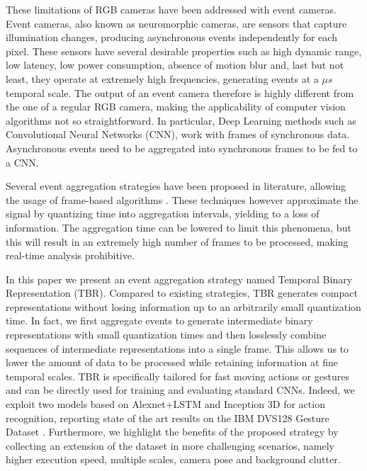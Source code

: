 \documentclass[a4paper,conference]{IEEEtran}
\begin{document}
These limitations of RGB cameras have been addressed with event cameras. Event cameras, also known as neuromorphic cameras, are sensors that capture illumination changes, producing asynchronous events independently for each pixel. These sensors have several desirable properties such as high dynamic range, low latency, low power consumption, absence of motion blur and, last but not least, they operate at extremely high frequencies, generating events at a $\mu s$ temporal scale. The output of an event camera therefore is highly different from the one of a regular RGB camera, making the applicability of computer vision algorithms not so straightforward. In particular, Deep Learning methods such as Convolutional Neural Networks (CNN), work with frames of synchronous data. Asynchronous events need to be aggregated into synchronous frames to be fed to a CNN.

Several event aggregation strategies have been proposed in literature, allowing the usage of frame-based algorithms \cite{nguyen2019real, miao2019neuromorphic, ghosh2019spatiotemporal, cannici2020differentiable, cannici2019asynchronous}. These techniques however approximate the signal by quantizing time into aggregation intervals, yielding to a loss of information. The aggregation time can be lowered to limit this phenomena, but this will result in an extremely high number of frames to be processed, making real-time analysis prohibitive.

In this paper we present an event aggregation strategy named Temporal Binary Representation (TBR). Compared to existing strategies, TBR generates compact representations without losing information up to an arbitrarily small quantization time. In fact, we first aggregate events to generate intermediate binary representations with small quantization times and then losslessly combine sequences of intermediate representations into a single frame. This allows us to lower the amount of data to be processed while retaining information at fine temporal scales. TBR is specifically tailored for fast moving actions or gestures and can be directly used for training and evaluating standard CNNs. Indeed, we exploit two models based on Alexnet+LSTM and Inception 3D for action recognition, reporting state of the art results on the IBM DVS128 Gesture Dataset \cite{amir2017low}. Furthermore, we highlight the benefits of the proposed strategy by collecting an extension of the dataset in more challenging scenarios, namely higher execution speed, multiple scales, camera pose and background clutter.
\end{document}
